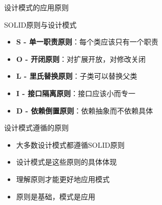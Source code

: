 \documentclass[UTF8,aspectratio=169]{beamer}
\begin{document}
\begin{frame}{设计模式的应用原则}
    \begin{ytublock}{SOLID原则与设计模式}
        \begin{itemize}
            \item \textbf{S - 单一职责原则}：每个类应该只有一个职责
            \item \textbf{O - 开闭原则}：对扩展开放，对修改关闭
            \item \textbf{L - 里氏替换原则}：子类可以替换父类
            \item \textbf{I - 接口隔离原则}：接口应该小而专一
            \item \textbf{D - 依赖倒置原则}：依赖抽象而不依赖具体
        \end{itemize}
    \end{ytublock}

    \begin{ytublock}{设计模式遵循的原则}
        \begin{itemize}
            \item 大多数设计模式都遵循SOLID原则
            \item 设计模式是这些原则的具体体现
            \item 理解原则才能更好地应用模式
            \item 原则是基础，模式是应用
        \end{itemize}
    \end{ytublock}
\end{frame}
\end{document}
